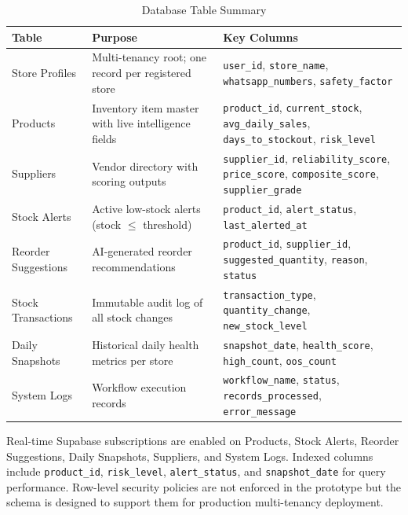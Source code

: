 \begin{table}[H]
\centering
\caption{Database Table Summary}
\label{tab:dbsummary}
{\singlespacing
\begin{tabularx}{\textwidth}{@{} >{\raggedright\arraybackslash}p{3.5cm} >{\raggedright\arraybackslash}X >{\raggedright\arraybackslash}p{6.5cm} @{}}
\toprule
\textbf{Table} & \textbf{Purpose} & \textbf{Key Columns} \\
\midrule
Store Profiles  & Multi-tenancy root; one record per registered store &
  \texttt{user\_id}, \texttt{store\_name}, \texttt{whatsapp\_numbers}, \texttt{safety\_factor} \\
\addlinespace
Products        & Inventory item master with live intelligence fields &
  \texttt{product\_id}, \texttt{current\_stock}, \texttt{avg\_daily\_sales},
  \texttt{days\_to\_stockout}, \texttt{risk\_level} \\
\addlinespace
Suppliers       & Vendor directory with scoring outputs &
  \texttt{supplier\_id}, \texttt{reliability\_score}, \texttt{price\_score},
  \texttt{composite\_score}, \texttt{supplier\_grade} \\
\addlinespace
Stock Alerts    & Active low-stock alerts (stock $\leq$ threshold) &
  \texttt{product\_id}, \texttt{alert\_status}, \texttt{last\_alerted\_at} \\
\addlinespace
Reorder Suggestions & AI-generated reorder recommendations &
  \texttt{product\_id}, \texttt{supplier\_id}, \texttt{suggested\_quantity}, \texttt{reason},
  \texttt{status} \\
\addlinespace
Stock Transactions & Immutable audit log of all stock changes &
  \texttt{transaction\_type}, \texttt{quantity\_change}, \texttt{new\_stock\_level} \\
\addlinespace
Daily Snapshots & Historical daily health metrics per store &
  \texttt{snapshot\_date}, \texttt{health\_score}, \texttt{high\_count}, \texttt{oos\_count} \\
\addlinespace
System Logs     & Workflow execution records &
  \texttt{workflow\_name}, \texttt{status}, \texttt{records\_processed}, \texttt{error\_message} \\
\bottomrule
\end{tabularx}
}
\end{table}

Real-time Supabase subscriptions are enabled on Products, Stock Alerts, Reorder Suggestions,
Daily Snapshots, Suppliers, and System Logs. Indexed columns include \texttt{product\_id},
\texttt{risk\_level}, \texttt{alert\_status}, and \texttt{snapshot\_date} for query performance.
Row-level security policies are not enforced in the prototype but the schema is designed to
support them for production multi-tenancy deployment.
